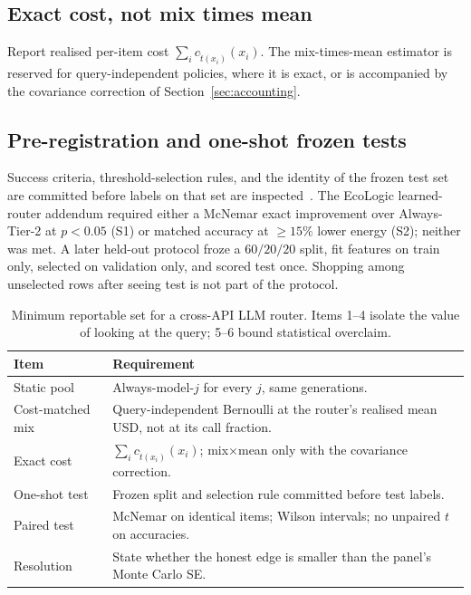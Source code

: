 \documentclass[a4paper,twoside]{article}
\begin{document}
\subsection{Exact cost, not mix times mean}

Report realised per-item cost $\sum_i c_{\hat t(x_i)}(x_i)$. The mix-times-mean estimator is reserved for query-independent policies, where it is exact, or is accompanied by the covariance correction of Section~\ref{sec:accounting}.

\subsection{Pre-registration and one-shot frozen tests}

Success criteria, threshold-selection rules, and the identity of the frozen test set are committed before labels on that set are inspected~\cite{nosek2018prereg}. The EcoLogic learned-router addendum required either a McNemar exact improvement over Always-Tier-2 at $p<0.05$ (S1) or matched accuracy at $\ge 15\%$ lower energy (S2); neither was met. A later held-out protocol froze a $60/20/20$ split, fit features on train only, selected on validation only, and scored test once. Shopping among unselected rows after seeing test is not part of the protocol.

\begin{table}[t]
\centering
\caption{Minimum reportable set for a cross-API LLM router. Items 1--4 isolate the value of looking at the query; 5--6 bound statistical overclaim.}
\label{tab:checklist}
\scriptsize
\begin{tabular}{@{}p{} p{}@{}}
\toprule
Item & Requirement \\
\midrule
Static pool & Always-model-$j$ for every $j$, same generations. \\
Cost-matched mix & Query-independent Bernoulli at the router's realised mean USD, not at its call fraction. \\
Exact cost & $\sum_i c_{\hat t(x_i)}(x_i)$; mix$\times$mean only with the covariance correction. \\
One-shot test & Frozen split and selection rule committed before test labels. \\
Paired test & McNemar on identical items; Wilson intervals; no unpaired $t$ on accuracies. \\
Resolution & State whether the honest edge is smaller than the panel's Monte Carlo SE. \\
\bottomrule
\end{tabular}
\end{table}
\end{document}
